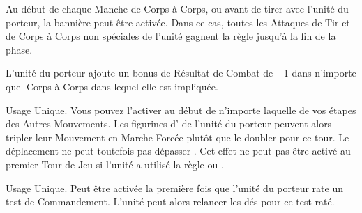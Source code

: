 Au début de chaque Manche de Corps à Corps, ou avant de tirer avec l'unité du porteur, la bannière peut être activée. Dans ce cas, toutes les Attaques de Tir et de Corps à Corps non spéciales de l'unité gagnent la règle \flamingattacks{} jusqu'à la fin de la phase.

\columnbreak

L'unité du porteur ajoute un bonus de Résultat de Combat de +1 dans n'importe quel Corps à Corps dans lequel elle est impliquée.

Usage Unique. Vous pouvez l'activer au début de n'importe laquelle de vos étapes des Autres Mouvements. Les figurines d'\infantry{} de l'unité du porteur peuvent alors tripler leur Mouvement en Marche Forcée plutôt que le doubler pour ce tour. Le déplacement ne peut toutefois pas dépasser . Cet effet ne peut pas être activé au premier Tour de Jeu si l'unité a utilisé la règle \vanguard{} ou \scout{}.

Usage Unique. Peut être activée la première fois que l'unité du porteur rate un test de Commandement. L'unité peut alors relancer les dés pour ce test raté.

\endpricelist

